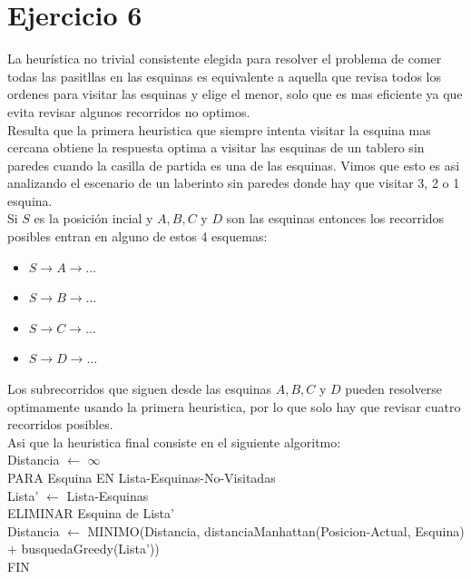 \documentclass[12pt, titlepage, a4paper]{article}
\begin{document}
\section{Ejercicio 6}
La heurística no trivial consistente elegida para resolver el problema de comer todas las pasitllas en las esquinas
es equivalente a aquella que revisa todos los ordenes para visitar las esquinas y elige el menor, solo que es mas eficiente
ya que evita revisar algunos recorridos no optimos.\\

Resulta que la primera heuristica que siempre intenta visitar la esquina mas cercana obtiene la respuesta optima
a visitar las esquinas de un tablero sin paredes cuando la casilla de partida es una de las esquinas. Vimos que esto es asi
analizando el escenario de un laberinto sin paredes donde hay que visitar 3, 2 o 1 esquina.\\

Si $S$ es la posición incial y $A,B,C \text{ y } D$ son las esquinas entonces los recorridos posibles entran en alguno de estos 4 esquemas:

\begin{itemize}
    \item $S\rightarrow A \rightarrow \dots$
    \item $S\rightarrow B \rightarrow \dots$
    \item $S\rightarrow C \rightarrow \dots$
    \item $S\rightarrow D \rightarrow \dots$
\end{itemize}

Los subrecorridos que siguen desde las esquinas $A,B,C \text{ y } D$ pueden resolverse optimamente usando la primera heuristica, por lo que
solo hay que revisar cuatro recorridos posibles.\\

Asi que la heuristica final consiste en el siguiente algoritmo:\\

\noindent  Distancia $\leftarrow$ $\infty$\\

\noindent PARA Esquina EN Lista-Esquinas-No-Visitadas\\
\indent Lista' $\leftarrow$ Lista-Esquinas\\
\indent ELIMINAR Esquina de Lista'\\
\indent Distancia $\leftarrow$ MINIMO(Distancia, distanciaManhattan(Posicion-Actual, Esquina) + busquedaGreedy(Lista'))\\
\noindent FIN\\
\end{document}

